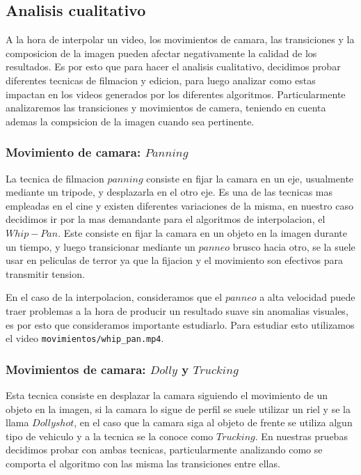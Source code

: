 \subsection{Analisis cualitativo}

A la hora de interpolar un video, los movimientos de camara, las transiciones y la composicion de la imagen pueden afectar negativamente la calidad de los resultados. Es por esto que para hacer el analisis cualitativo, decidimos probar diferentes tecnicas de filmacion y edicion, para luego analizar como estas impactan en los videos generados por los diferentes algoritmos. Particularmente analizaremos las transiciones y movimientos de camera, teniendo en cuenta ademas la compsicion de la imagen cuando sea pertinente.

\subsubsection{Movimiento de camara: $Panning$}

La tecnica de filmacion $panning$ consiste en fijar la camara en un eje, usualmente mediante un tripode, y desplazarla en el otro eje. Es una de las tecnicas mas empleadas en el cine y existen diferentes variaciones de la misma, en nuestro caso decidimos ir por la mas demandante para el algoritmos de interpolacion, el $Whip-Pan$. Este consiste en fijar la camara en un objeto en la imagen durante un tiempo, y luego transicionar mediante un $panneo$ brusco hacia otro, se la suele usar en peliculas de terror ya que la fijacion y el movimiento son efectivos para transmitir tension.

En el caso de la interpolacion, consideramos que el $panneo$ a alta velocidad puede traer problemas a la hora de producir un resultado suave sin anomalias visuales, es por esto que consideramos importante estudiarlo. Para estudiar esto utilizamos el video \texttt{movimientos/whip\_pan.mp4}.

\subsubsection{Movimientos de camara: $Dolly$ y $Trucking$}

Esta tecnica consiste en desplazar la camara siguiendo el movimiento de un objeto en la imagen, si la camara lo sigue de perfil se suele utilizar un riel y se la llama $Dolly shot$, en el caso que la camara siga al objeto de frente se utiliza algun tipo de vehiculo y a la tecnica se la conoce como $Trucking$. En nuestras pruebas decidimos probar con ambas tecnicas, particularmente analizando como se comporta el algoritmo con las misma las transiciones entre ellas.

